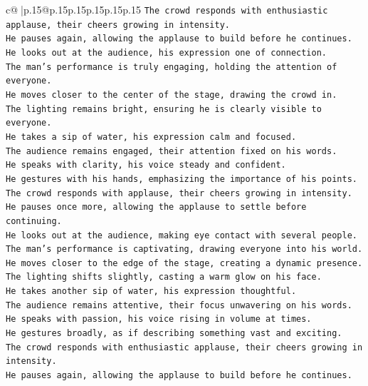 \documentclass{article}
\begin{document}
{\begin{supertabular}{c@{$\;$}|p{.15\linewidth}@{}p{.15\linewidth}p{.15\linewidth}p{.15\linewidth}p{.15\linewidth}p{.15\linewidth}}
{{{\texttt{The crowd responds with enthusiastic applause, their cheers growing in intensity.  } \\
\texttt{He pauses again, allowing the applause to build before he continues.  } \\
\texttt{He looks out at the audience, his expression one of connection.  } \\
\texttt{The man's performance is truly engaging, holding the attention of everyone.  } \\
\texttt{He moves closer to the center of the stage, drawing the crowd in.  } \\
\texttt{The lighting remains bright, ensuring he is clearly visible to everyone.  } \\
\texttt{He takes a sip of water, his expression calm and focused.  } \\
\texttt{The audience remains engaged, their attention fixed on his words.  } \\
\texttt{He speaks with clarity, his voice steady and confident.  } \\
\texttt{He gestures with his hands, emphasizing the importance of his points.  } \\
\texttt{The crowd responds with applause, their cheers growing in intensity.  } \\
\texttt{He pauses once more, allowing the applause to settle before continuing.  } \\
\texttt{He looks out at the audience, making eye contact with several people.  } \\
\texttt{The man's performance is captivating, drawing everyone into his world.  } \\
\texttt{He moves closer to the edge of the stage, creating a dynamic presence.  } \\
\texttt{The lighting shifts slightly, casting a warm glow on his face.  } \\
\texttt{He takes another sip of water, his expression thoughtful.  } \\
\texttt{The audience remains attentive, their focus unwavering on his words.  } \\
\texttt{He speaks with passion, his voice rising in volume at times.  } \\
\texttt{He gestures broadly, as if describing something vast and exciting.  } \\
\texttt{The crowd responds with enthusiastic applause, their cheers growing in intensity.  } \\
\texttt{He pauses again, allowing the applause to build before he continues.  } \\
}}}
\end{supertabular}}
\end{document}
